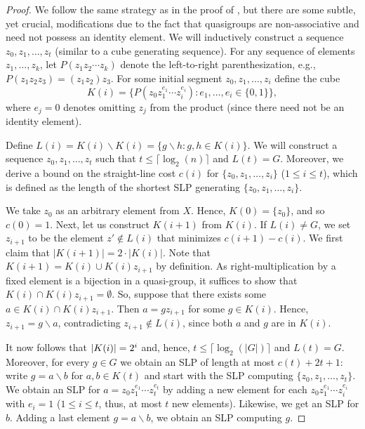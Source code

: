 \documentclass{theoretics}
\newcommand{\abs}[1]{\left|\mathinner{#1}\right|}
\begin{document}
\begin{proof}
We follow the same strategy as in the proof of \cite[Theorem~3.1]{BabaiSzemeredi}, but there are some subtle, yet crucial, modifications due to the fact that quasigroups are non-associative and need not possess an identity element. We will inductively construct a sequence $z_0,z_{1}, \ldots, z_{t}$ (similar to a cube generating sequence). For any sequence of elements $z_1,\dotsc,z_k$, let $P(z_1 z_2 \dotsb z_k)$ denote the left-to-right parenthesization, e.g., $P(z_1 z_2 z_3) = (z_1 z_2) z_3$. For some initial segment $z_0, z_{1}, \ldots, z_{i}$ define the cube
\[
K(i) = \{ P(z_0z_{1}^{e_{1}} \cdots z_{i}^{e_{i}}) : e_{1}, \ldots, e_{i} \in \{0,1\}\},
\]
where $e_j=0$ denotes omitting $z_j$ from the product (since there need not be an identity element).


 Define $L(i) = K(i)\backslash K(i) = \{ g\backslash h : g,h \in K(i)\}$.
We will construct a sequence $z_0,z_{1}, \ldots, z_{t}$ such that $t \leq \lceil \log_{2}(n) \rceil$ and $L(t) = G$. Moreover, we derive a bound on the straight-line cost $c(i)$ for $\{z_0,z_{1}, \ldots, z_{i}\}$ ($1\leq i \leq t$), which is defined as the length of the shortest SLP generating $\{z_0,z_{1}, \ldots, z_{i}\}$. 

We take $z_0$ as an arbitrary element from $X$. Hence,  $K(0) = \{z_0\}$, and so $c(0) = 1$. 
Next, let us construct $K(i+1)$ from $K(i)$. If $L(i) \neq G$, we set $z_{i+1}$ to be the element $z' \notin L(i)$ that minimizes $c(i+1)-c(i)$. 
We first claim that $|K(i+1)| = 2 \cdot |K(i)|$.
Note that $K(i+1)= K(i) \cup K(i)z_{i+1}$ by definition.
As right-multiplication by a fixed element is a bijection in a quasi-group, it suffices to show that $K(i) \cap K(i)z_{i+1} = \emptyset$.
So, suppose that there exists some $a \in K(i) \cap K(i)z_{i+1}$. Then $a = gz_{i+1}$ for some $g \in K(i)$. Hence, $z_{i+1} = g\backslash a$, contradicting $z_{i+1} \not\in L(i)$, since both $a$ and $g$ are in $K(i)$. 

It now follows that $\abs{K(i)} = 2^i$ and, hence, $t \leq \lceil \log_{2}(|G|) \rceil$ and $L(t) = G$. 
Moreover, for every $g \in G$ we obtain an SLP of length at most $c(t) + 2t + 1$: write $g = a\backslash b$ for $a,b \in K(t)$ and start with the SLP computing $\{z_0,z_{1}, \ldots, z_{t}\}$. We obtain an SLP for $a = z_0z_{1}^{e_{1}} \cdots z_{t}^{e_{t}}$ by adding a new element for each $z_0z_{1}^{e_{1}} \cdots z_{i}^{e_{i}}$ with $e_i = 1$ ($1\leq i \leq t$, thus, at most $t$ new elements). Likewise, we get an SLP for $b$. Adding a last element $g=a\backslash b$, we obtain an SLP computing $g$.




\end{proof}
\end{document}
